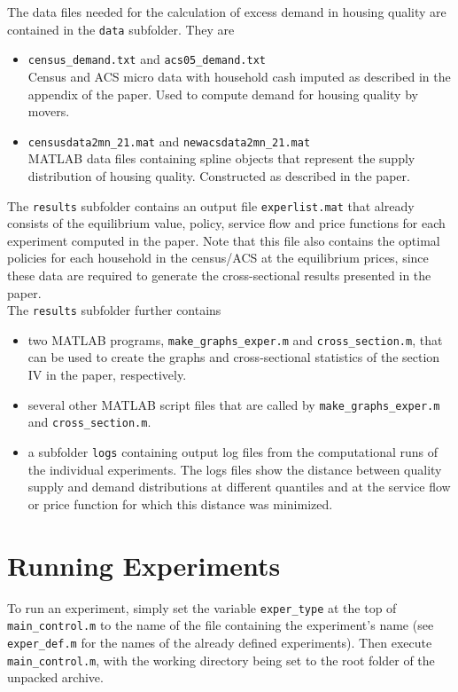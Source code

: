 \documentclass[letterpaper,12pt]{article}
\begin{document}
The data files needed for the calculation of excess demand in housing quality are contained in the \verb|data| subfolder. They are
\begin{itemize}
	\item \verb|census_demand.txt| and \verb|acs05_demand.txt|\\
		  Census and ACS micro data with household cash imputed as described in the appendix of the paper. Used to compute demand for housing quality by movers.
	\item \verb|censusdata2mn_21.mat| and \verb|newacsdata2mn_21.mat|\\		  
		  MATLAB data files containing spline objects that represent the supply distribution of housing quality. Constructed as described in the paper.
\end{itemize}


The \verb|results| subfolder contains an output file \verb|experlist.mat| that already consists of the equilibrium value, policy, service flow and price functions for each experiment computed in the paper. Note that this file also contains the optimal policies for each household in the census/ACS at the equilibrium prices, since these data are required to generate the cross-sectional results presented in the paper.\\

The \verb|results| subfolder further contains
\begin{itemize}
	\item two MATLAB programs, \verb|make_graphs_exper.m| and \verb|cross_section.m|, that can be used to create the graphs and cross-sectional statistics of the section IV in the paper, respectively.
	\item several other MATLAB script files that are called by  \verb|make_graphs_exper.m| and \verb|cross_section.m|.
	\item a subfolder \verb|logs| containing output log files from the computational runs of the individual experiments. The logs files show the distance between quality supply and demand distributions at different quantiles and at the service flow or price function for which this distance was minimized. 
\end{itemize}

\section{Running Experiments}

To run an experiment, simply set the variable \verb|exper_type| at the top of \verb|main_control.m| to the name of the file containing the experiment's name (see \verb|exper_def.m| for the names of the already defined experiments). Then execute \verb|main_control.m|, with the working directory being set to the root folder of the unpacked archive. 
\end{document}
